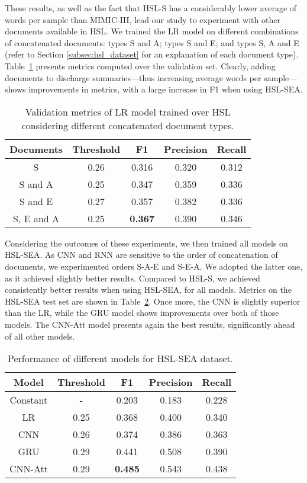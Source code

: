 \documentclass[runningheads]{llncs}
\begin{document}
These results, as well as the fact that HSL-S has a considerably lower average of words per sample than MIMIC-III, lead our study to experiment with other documents available in HSL. We trained the LR model on different combinations of concatenated documents: types S and A; types S and E; and types S, A and E (refer to Section \ref{subsec:hsl_dataset} for an explanation of each document type). Table~\ref{tab:hsl_thresh_lr} presents metrics computed over the validation set. Clearly, adding documents to discharge summaries---thus increasing average words per sample---shows improvements in metrics, with a large increase in F1 when using HSL-SEA.

\begin{table}[t]
	\centering
	\caption{Validation metrics of LR model trained over HSL considering different concatenated document types.}
	\begin{tabular}{c|c|c|c|c}
		Documents  & Threshold &       F1       & Precision & Recall \\ \hline\hline
		    S      &   0.26    &     0.316      &   0.320   & 0.312  \\ \hline
		 S and A   &   0.25    &     0.347      &   0.359   & 0.336  \\ \hline
		 S and E   &   0.27    &     0.357      &   0.382   & 0.336  \\ \hline
		S, E and A &   0.25    & \textbf{0.367} &   0.390   & 0.346
	\end{tabular}
	\label{tab:hsl_thresh_lr}
\end{table}


Considering the outcomes of these experiments, we then trained all models on HSL-SEA. As CNN and RNN are sensitive to the order of concatenation of documents, we experimented orders S-A-E and S-E-A. We adopted the latter one, as it achieved slightly better results. Compared to HSL-S, we achieved consistently better results when using HSL-SEA, for all models. 
Metrics on the HSL-SEA test set are shown in Table~\ref{tab:hsl_thresh_res_safe}. Once more, the CNN is slightly superior than the LR, while the GRU model shows improvements over both of those models. The CNN-Att model presents again the best results, significantly ahead of all other models.

\begin{table}[t]
	\centering
	\caption{Performance of different models for HSL-SEA dataset.}
	\begin{tabular}{c|c|c|c|c}
		 Model   & Threshold &       F1       & Precision & Recall \\ \hline\hline
		Constant &     -     &     0.203      &   0.183   & 0.228  \\ \hline
		   LR    &   0.25    &     0.368      &   0.400   & 0.340  \\ \hline
		  CNN    &   0.26    &     0.374      &   0.386   & 0.363  \\ \hline
		  GRU    &   0.29    &     0.441      &   0.508   & 0.390  \\ \hline
		CNN-Att  &   0.29    & \textbf{0.485} &   0.543   & 0.438
	\end{tabular}
	\label{tab:hsl_thresh_res_safe}
\end{table}
\end{document}
